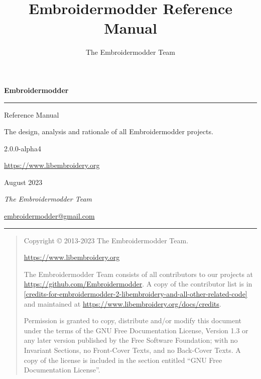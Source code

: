\documentclass[a4paper]{report}
\title{Embroidermodder Reference Manual \embversion}
\author{The Embroidermodder Team}
\newcommand{\embversion}{2.0.0-alpha4}
\newcommand{\publicationdate}{August 2023}
\begin{document}
\begin{titlepage}

\vspace*{8cm}

\noindent\textbf{\Huge Embroidermodder}

\vspace{10pt}

\noindent\rule{\linewidth}{2pt}

\vspace{10pt}

\begin{flushright}
\Large
    Reference Manual

\normalsize
    The design, analysis and rationale of all Embroidermodder projects.

\embversion

\vspace{10pt}

\url{https://www.libembroidery.org}

\publicationdate
\end{flushright}

\vspace{6cm}

\begin{flushleft}
\Large
\emph{The Embroidermodder Team}

\url{embroidermodder@gmail.com}

\vspace{10pt}

\noindent\rule{\linewidth}{1pt}

\end{flushleft}
    
\end{titlepage}


\vspace*{8cm}

\begin{quote}
Copyright \copyright{} 2013-2023 The Embroidermodder Team.

\url{https://www.libembroidery.org}

The Embroidermodder Team consists of all contributors to our projects
at \url{https://github.com/Embroidermodder}. A copy of the contributor
list is in
\ref{credits-for-embroidermodder-2-libembroidery-and-all-other-related-code}
and maintained at \url{https://www.libembroidery.org/docs/credits}.

\bigskip

Permission is granted to copy, distribute and/or modify this document
under the terms of the GNU Free Documentation License, Version 1.3
or any later version published by the Free Software Foundation;
with no Invariant Sections, no Front-Cover Texts, and no Back-Cover Texts.
A copy of the license is included in the section entitled ``GNU
Free Documentation License''.
\end{quote}
\end{document}
